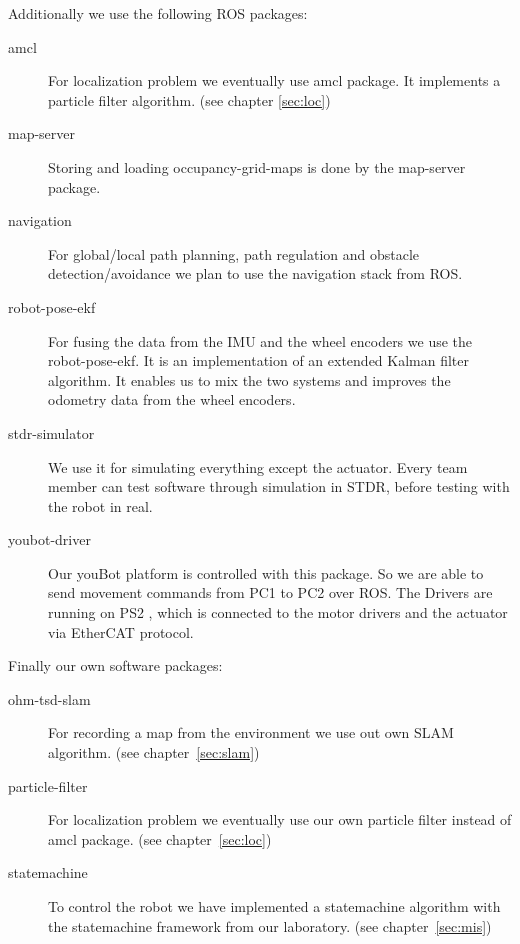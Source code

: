 \noindent Additionally we use the following ROS packages:

\begin{description}
	\item [amcl] For localization problem we eventually use amcl package. It implements a particle filter algorithm. (see chapter \ref{sec:loc})
	\item [map-server] Storing and loading occupancy-grid-maps is done by the map-server package.
	\item [navigation] For global/local path planning, path regulation and obstacle detection/avoidance we plan to use the navigation stack from ROS.
	\item [robot-pose-ekf] For fusing the data from the IMU and the wheel encoders we use the robot-pose-ekf. It is an implementation of an extended Kalman filter algorithm. It enables us to mix the two systems and improves the odometry data from the wheel encoders.
	\item [stdr-simulator] We use it for simulating everything except the actuator. Every team member can test software through simulation in STDR, before testing with the robot in real.
	\item [youbot-driver] Our youBot platform is controlled with this package. So we are able to send movement commands from PC1 to PC2 over ROS. The Drivers are running on PS2 , which is connected to the motor drivers and the actuator via EtherCAT protocol.
\end{description}

\noindent Finally our own software packages:

\begin{description}
	\item [ohm-tsd-slam] For recording a map from the environment we use out own SLAM algorithm. (see chapter~\ref{sec:slam})
	\item [particle-filter] For localization problem we eventually use our own particle filter instead of amcl package. (see chapter~\ref{sec:loc})
	\item [statemachine] To control the robot we have implemented a statemachine algorithm with the statemachine framework from our laboratory. (see chapter~\ref{sec:mis})
\end{description}

